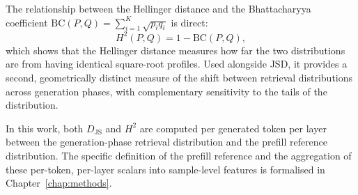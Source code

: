 The relationship between the Hellinger distance and the Bhattacharyya coefficient
$\mathrm{BC}(P, Q) = \sum_{i=1}^{K} \sqrt{p_i q_i}$ is direct:
\begin{equation}
    H^2(P, Q) = 1 - \mathrm{BC}(P, Q),
    \label{eq:hellinger_bhattacharyya}
\end{equation}
which shows that the Hellinger distance measures how far the two distributions are
from having identical square-root profiles. Used alongside JSD, it provides a
second, geometrically distinct measure of the shift between retrieval distributions
across generation phases, with complementary sensitivity to the tails of the
distribution.

In this work, both $D_{\mathrm{JS}}$ and $H^2$ are computed per generated token per
layer between the generation-phase retrieval distribution and the prefill reference
distribution. The specific definition of the prefill reference and the aggregation
of these per-token, per-layer scalars into sample-level features is formalised in
Chapter~\ref{chap:methods}.%
